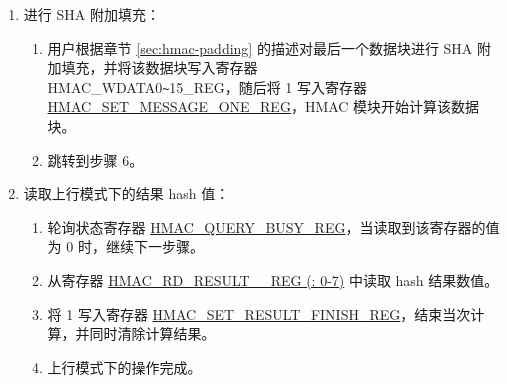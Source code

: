 \documentclass[main\_\_CN.tex]{subfiles}
\begin{document}
\begin{enumerate}
\begin{enumerate}
\begin{itemize}
\begin{enumerate}
                \end{enumerate}
                \item 如果待处理数据总位数不是 512 的倍数，有以下 3 种选项。注意，这种情况下用户应对数据进行 SHA 附加填充，且填充后待输入数据总位数应为 512 的整数倍。
                \begin{enumerate}
                    \item 如果 Block\_\textcolor{red}{n} 是唯一一个数据块，同时 Block\_\textcolor{red}{1} 已经包含了所有的填充位，则将 1 写入寄存器 \hyperref[regdesc:HMACONEBLOCKREG]{HMAC\_ONE\_BLOCK\_REG}，随后跳转到步骤 6。
                    \item 如果 Block\_\textcolor{red}{n} 是倒数第二个填充数据块，则将 1 写入寄存器\\ \hyperref[regdesc:HMACSETMESSAGEPADREG]{HMAC\_SET\_MESSAGE\_PAD\_REG}，随后跳转到步骤 5。
                    \item 如果 Block\_\textcolor{red}{n} 既不是最后一个也不是倒数第二个数据块，则将 1 写入寄存器 \\\hyperref[regdesc:HMACSETMESSAGEINGREG]{HMAC\_SET\_MESSAGE\_ING\_REG}，令$n=n+1$，随后跳转到步骤 4.(b)。
                \end{enumerate}
            \end{itemize}
        \end{enumerate}

    \item 进行 SHA 附加填充：
    \begin{enumerate}
        \item 用户根据章节 \ref{sec:hmac-padding} 的描述对最后一个数据块进行 SHA 附加填充，并将该数据块写入寄存器\\ HMAC\_WDATA0\verb+~+15\_REG，随后将 1 写入寄存器 \hyperref[regdesc:HMACSETMESSAGEONEREG]{HMAC\_SET\_MESSAGE\_ONE\_REG}，HMAC 模块开始计算该数据块。
        \item 跳转到步骤 6。
    \end{enumerate}

    \item 读取上行模式下的结果 hash 值：
    \begin{enumerate}
        \item 轮询状态寄存器 \hyperref[regdesc:HMACQUERYBUSYREG]{HMAC\_QUERY\_BUSY\_REG}，当读取到该寄存器的值为 0 时，继续下一步骤。
        \item 从寄存器 \hyperref[regdesc:HMACRDRESULTNREG]{HMAC\_RD\_RESULT\_\_REG (: 0-7)} 中读取 hash 结果数值。
        \item 将 1 写入寄存器 \hyperref[regdesc:HMACSETRESULTFINISHREG]{HMAC\_SET\_RESULT\_FINISH\_REG}，结束当次计算，并同时清除计算结果。
        \item 上行模式下的操作完成。
    \end{enumerate}

\end{enumerate}
\end{document}

